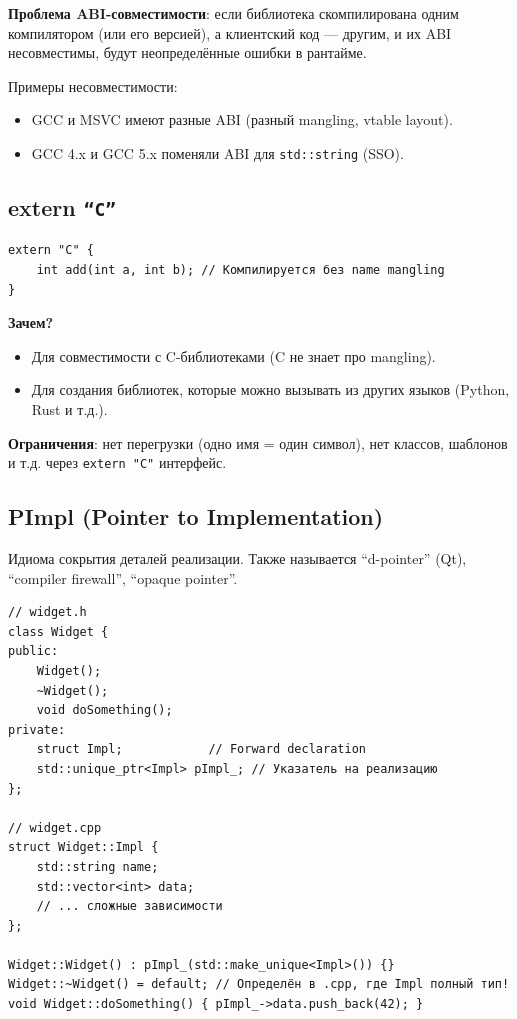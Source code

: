 \documentclass[12pt,a4paper]{article}
\begin{document}
\textbf{Проблема ABI-совместимости}: если библиотека скомпилирована одним компилятором (или его версией), а клиентский код --- другим, и их ABI несовместимы, будут неопределённые ошибки в рантайме.

Примеры несовместимости:
\begin{itemize}
    \item GCC и MSVC имеют разные ABI (разный mangling, vtable layout).
    \item GCC 4.x и GCC 5.x поменяли ABI для \texttt{std::string} (SSO).
\end{itemize}

\subsection{extern \texttt{``C''}}

\begin{lstlisting}
extern "C" {
    int add(int a, int b); // Компилируется без name mangling
}
\end{lstlisting}

\textbf{Зачем?}
\begin{itemize}
    \item Для совместимости с C-библиотеками (C не знает про mangling).
    \item Для создания библиотек, которые можно вызывать из других языков (Python, Rust и т.д.).
\end{itemize}

\textbf{Ограничения}: нет перегрузки (одно имя = один символ), нет классов, шаблонов и т.д. через \texttt{extern "C"} интерфейс.

\subsection{PImpl (Pointer to Implementation)}

Идиома сокрытия деталей реализации. Также называется ``d-pointer'' (Qt), ``compiler firewall'', ``opaque pointer''.

\begin{lstlisting}
// widget.h
class Widget {
public:
    Widget();
    ~Widget();
    void doSomething();
private:
    struct Impl;            // Forward declaration
    std::unique_ptr<Impl> pImpl_; // Указатель на реализацию
};

// widget.cpp
struct Widget::Impl {
    std::string name;
    std::vector<int> data;
    // ... сложные зависимости
};

Widget::Widget() : pImpl_(std::make_unique<Impl>()) {}
Widget::~Widget() = default; // Определён в .cpp, где Impl полный тип!
void Widget::doSomething() { pImpl_->data.push_back(42); }
\end{lstlisting}
\end{document}
